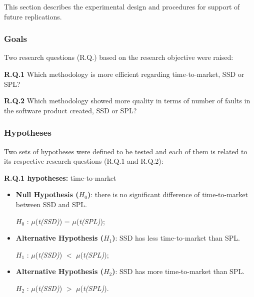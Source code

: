 This section describes the experimental design and procedures for support of future replications.

\subsubsection{Goals}

Two research questions (R.Q.) based on the research objective were raised:

\textbf{R.Q.1} Which methodology is more efficient regarding time-to-market, SSD or SPL?

\textbf{R.Q.2} Which methodology showed more quality in terms of number of faults in the software product created, SSD or SPL?

\subsubsection{Hypotheses}

Two sets of hypotheses were defined to be tested and each of them is related to its respective research questions (R.Q.1 and R.Q.2):

\textbf{R.Q.1 hypotheses:} time-to-market

	\begin{itemize}
	
	\item \textbf{Null Hypothesis ($H_{0}$)}: there is no significant difference of time-to-market between SSD and SPL.
	
	$H_{0}$ : $\mu$(\textit{t(SSD)}) =  $\mu$(\textit{t(SPL)});
	
	\item \textbf{Alternative Hypothesis ($H_{1}$)}: SSD has less time-to-market than SPL.
	
	$H_{1}$ : $\mu$(\textit{t(SSD)}) $<$ $\mu$(\textit{t(SPL)});
		
	
	\item \textbf{Alternative Hypothesis ($H_{2}$)}: SSD has more time-to-market than SPL.
	
	$H_{2}$ :  $\mu$(\textit{t(SSD)}) $>$ $\mu$(\textit{t(SPL)}).		
	
	\end{itemize}	

